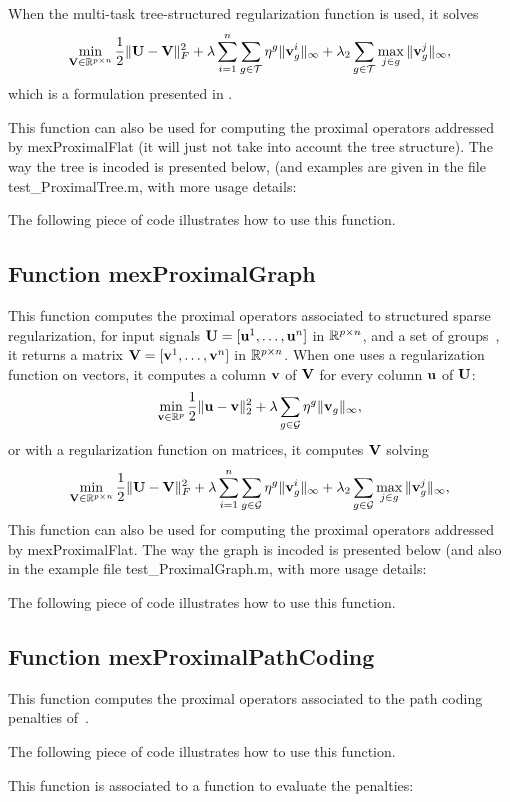 \documentclass[a4paper, 11pt]{article}
\begin{document}
   When the multi-task tree-structured regularization function is used, it solves
   \begin{equation}
   \min_{{\mathbf V} \in {\mathbb R}^{p\times n}} \frac{1}{2}\|{\mathbf U}-{\mathbf V}\|_F^2 + \lambda \sum_{i=1}^n\sum_{g \in {\mathcal T}} \eta^g \|{\mathbf v}^i_g\|_\infty + \lambda_2\sum_{g \in {\mathcal T}} \max_{j \in g} \|{\mathbf v}^j_g\|_\infty,
   \end{equation}
   which is a formulation presented in \cite{mairal10}.

   This function can also be used for computing the proximal operators addressed by mexProximalFlat (it will just not take into account the tree structure). The way the tree is incoded is presented below, (and examples are given in the file test\_ProximalTree.m, with more usage details:

The following piece of code illustrates how to use this function.


\subsection{Function mexProximalGraph}
This function computes the proximal operators associated to structured sparse regularization, for input signals ${\mathbf U}=[{\mathbf u}^1,\ldots,{\mathbf u}^n]$ in ${\mathbb R}^{p \times n}$, and a set of groups~\cite{mairal10}, it returns a matrix ${\mathbf V}=[{\mathbf v}^1,\ldots,{\mathbf v}^n]$ in ${\mathbb R}^{p \times n}$.
When one uses a regularization function on vectors, it computes a column ${\mathbf v}$ of ${\mathbf V}$ for every column ${\mathbf u}$ of ${\mathbf U}$:
\begin{equation}
\min_{{\mathbf v} \in {\mathbb R}^p} \frac{1}{2}\|{\mathbf u}-{\mathbf v}\|_2^2 + \lambda \sum_{g \in {\mathcal G}} \eta^g \|{\mathbf v}_g\|_\infty,
\end{equation}
or with a regularization function on matrices, it computes ${\mathbf V}$ solving
\begin{equation}
\min_{{\mathbf V} \in {\mathbb R}^{p\times n}} \frac{1}{2}\|{\mathbf U}-{\mathbf V}\|_F^2 + \lambda \sum_{i=1}^n\sum_{g \in {\mathcal G}} \eta^g \|{\mathbf v}^i_g\|_\infty + \lambda_2\sum_{g \in {\mathcal G}} \max_{j \in g} \|{\mathbf v}^j_g\|_\infty,
\end{equation}
This function can also be used for computing the proximal operators addressed by mexProximalFlat. The way the graph is incoded is presented below (and also in the example file test\_ProximalGraph.m, with more usage details:

The following piece of code illustrates how to use this function.


\subsection{Function mexProximalPathCoding}
This function computes the proximal operators associated to the path coding penalties of~\cite{mairal14}.

The following piece of code illustrates how to use this function.

This function is associated to a function to evaluate the penalties:
\end{document}
